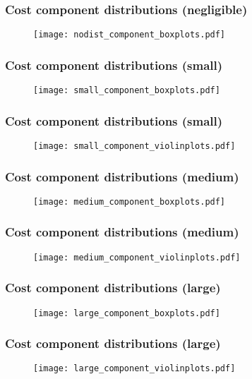 \begin{frame}
    \frametitle{Cost component distributions (negligible)}

    \begin{figure}
    \texttt{[image: nodist\_component\_boxplots.pdf]}
    \end{figure}
\end{frame}


\begin{frame}
    \frametitle{Cost component distributions (small)}

    \begin{figure}
    \texttt{[image: small\_component\_boxplots.pdf]}
    \end{figure}
\end{frame}

\begin{frame}
    \frametitle{Cost component distributions (small)}

    \begin{figure}
    \texttt{[image: small\_component\_violinplots.pdf]}
    \end{figure}
\end{frame}


\begin{frame}
    \frametitle{Cost component distributions (medium)}

    \begin{figure}
    \texttt{[image: medium\_component\_boxplots.pdf]}
    \end{figure}
\end{frame}

\begin{frame}
    \frametitle{Cost component distributions (medium)}

    \begin{figure}
    \texttt{[image: medium\_component\_violinplots.pdf]}
    \end{figure}
\end{frame}


\begin{frame}
    \frametitle{Cost component distributions (large)}

    \begin{figure}
    \texttt{[image: large\_component\_boxplots.pdf]}
    \end{figure}
\end{frame}

\begin{frame}
    \frametitle{Cost component distributions (large)}

    \begin{figure}
    \texttt{[image: large\_component\_violinplots.pdf]}
    \end{figure}
\end{frame}
